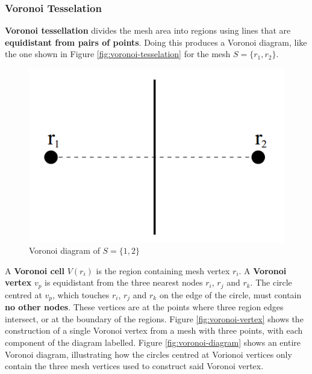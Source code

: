 \documentclass{article}
\begin{document}
\subsubsection{Voronoi Tesselation}

\textbf{Voronoi tessellation} divides the mesh area into regions using lines that are \textbf{equidistant from pairs of points}. Doing this produces a Voronoi diagram, like the one shown in Figure \ref{fig:voronoi-tesselation} for the mesh $S = \lbrace r_1, r_2 \rbrace$.

\begin{figure}
	\centering
	\includegraphics[scale=0.35]{figures/voronoi-basic-diagram.png}
	\caption{Voronoi diagram of $S = \lbrace 1, 2 \rbrace$}
	\label{fig:unstructered-mesh-construction}
\end{figure}

A \textbf{Voronoi cell} $V(r_i)$ is the region containing mesh vertex $r_i$. A \textbf{Voronoi vertex} $v_p$ is equidistant from the three nearest nodes $r_i$, $r_j$ and $r_k$. The circle centred at $v_p$, which touches $r_i$, $r_j$ and $r_k$ on the edge of the circle, must contain \textbf{no other nodes}. These vertices are at the points where three region edges intersect, or at the boundary of the regions. Figure \ref{fig:voronoi-vertex} shows the construction of a single Voronoi vertex from a mesh with three points, with each component of the diagram labelled. Figure \ref{fig:voronoi-diagram} shows an entire Voronoi diagram, illustrating how the circles centred at Vorionoi vertices only contain the three mesh vertices used to construct said Voronoi vertex.
\end{document}
